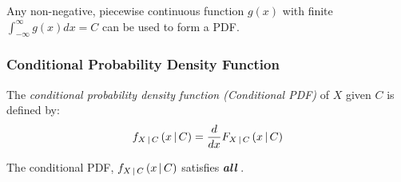 			\begin{remark*}
				Any non-negative, piecewise continuous function $g \left( x \right)$ with finite $\int_{-\infty}^{\infty} g \left( x \right) dx = C$ can be used to form a PDF.
			\end{remark*}
		
		\subsubsection{Conditional Probability Density Function} \label{subsubsec:Conditional Probability Density Function}
			\begin{definition} \label{def:Conditional Probability Density Function}
				The \emph{conditional probability density function (Conditional PDF)} of $X$ given $C$ is defined by:
				\begin{equation} \label{eq:Conditional Probability Density Function}
					f_{X \operatorname{\vert} C} \left( x \operatorname{\vert} C \right) = \frac{d}{dx} F_{X \operatorname{\vert} C} \left( x \operatorname{\vert} C \right)
				\end{equation}
				\begin{remark}
					The conditional PDF, $f_{X \operatorname{\vert} C} \left( x \operatorname{\vert} C \right)$ satisfies \emph{\textbf{all}} .
				\end{remark}
			\end{definition}
	
